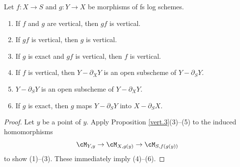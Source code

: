 \documentclass[10pt]{amsart}
\begin{document}
\begin{prop}
\label{vert.9}
Let $f\colon X\to S$ and $g\colon Y\to X$ be morphisms of fs log schemes.
\begin{enumerate}
\item[{\rm (1)}]
If $f$ and $g$ are vertical, then $gf$ is vertical.
\item[{\rm (2)}]
If $gf$ is vertical, then $g$ is vertical.
\item[{\rm (3)}]
If $g$ is exact and $gf$ is vertical, then $f$ is vertical.
\item[{\rm (4)}]
If $f$ is vertical, then $Y-\partial_X Y$ is an open subscheme of $Y-\partial_S Y$.
\item[{\rm (5)}]
$Y-\partial_S Y$ is an open subscheme of $Y-\partial_X Y$.
\item[{\rm (6)}] If $g$ is exact, then $g$ maps $Y-\partial_S Y$ into $X-\partial_S X$.
\end{enumerate}
\end{prop}
\begin{proof}
Let $y$ be a point of $y$.
Apply Proposition \ref{vert.3}(3)--(5) to the induced homomorphisms
\[
\cM_{Y,y}
\to
\cM_{X,g(y)}
\to
\cM_{S,f(g(y))}
\]
to show (1)--(3).
These immediately imply (4)--(6).
\end{proof}
\end{document}

